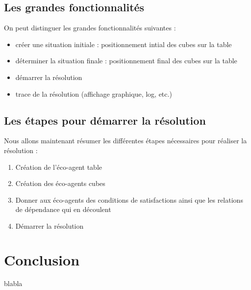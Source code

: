 \documentclass[12pt , a4paper]{article}
\begin{document}
\subsection{Les grandes fonctionnalités}
On peut distinguer les grandes fonctionnalités suivantes :
\begin{itemize}
\item créer une situation initiale : positionnement intial des cubes sur la table
\item déterminer la situation finale : positionnement final des cubes sur la table
\item démarrer la résolution
\item trace de la résolution (affichage graphique, log, etc.)
\end{itemize}

\subsection{Les étapes pour démarrer la résolution}
Nous allons maintenant résumer les différentes étapes nécessaires pour réaliser la résolution :
\begin{enumerate}
\item Création de l'éco-agent table
\item Création des  éco-agents cubes
\item Donner aux éco-agents des conditions de satisfactions ainsi que les relations de dépendance qui en découlent
\item Démarrer la résolution
\end{enumerate}


\newpage	
\section{Conclusion}
blabla
\end{document}

